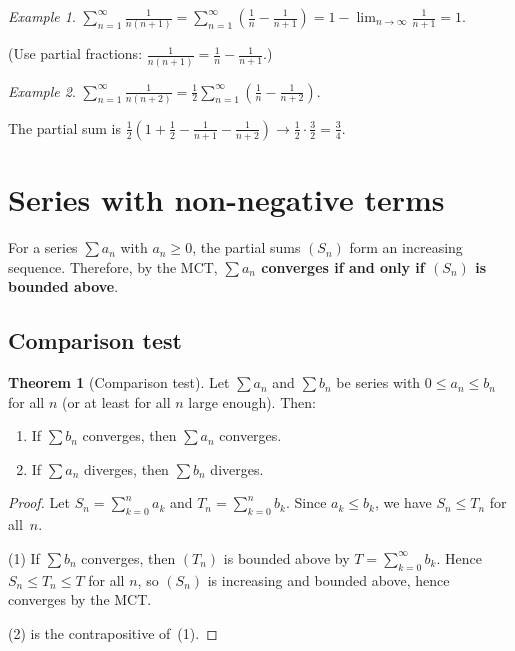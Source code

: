 \documentclass[12pt,a4paper,openany]{book}
\theoremstyle{definition}
\newtheorem{theorem}{Theorem}[chapter]
\theoremstyle{remark}
\newtheorem{example}{Example}[chapter]
\begin{document}
\begin{example}\label{ex:telescoping1}
$\displaystyle\sum_{n=1}^{\infty}\frac{1}{n(n+1)}
= \sum_{n=1}^{\infty}\left(\frac{1}{n} - \frac{1}{n+1}\right)
= 1 - \lim_{n\to\infty}\frac{1}{n+1} = 1$.

(Use partial fractions: $\frac{1}{n(n+1)} = \frac{1}{n} - \frac{1}{n+1}$.)
\end{example}

\begin{example}\label{ex:telescoping2}
$\displaystyle\sum_{n=1}^{\infty}\frac{1}{n(n+2)}
= \frac{1}{2}\sum_{n=1}^{\infty}\left(\frac{1}{n}-\frac{1}{n+2}\right)$.

The partial sum is
$\frac{1}{2}\!\left(1 + \frac{1}{2} - \frac{1}{n+1} - \frac{1}{n+2}\right)
\to \frac{1}{2}\cdot\frac{3}{2} = \frac{3}{4}$.
\end{example}

\section{Series with non-negative terms}\label{sec:positive-series}

For a series $\sum a_n$ with $a_n \geq 0$, the partial sums $(S_n)$ form an
increasing sequence. Therefore, by the MCT, \textbf{$\sum a_n$ converges
if and only if $(S_n)$ is bounded above}.

\subsection{Comparison test}\label{subsec:comparison}

\begin{theorem}[Comparison test]\label{thm:comparison}
Let $\sum a_n$ and $\sum b_n$ be series with $0 \leq a_n \leq b_n$ for all
$n$ (or at least for all $n$ large enough). Then:
\begin{enumerate}
\item If $\sum b_n$ converges, then $\sum a_n$ converges.
\item If $\sum a_n$ diverges, then $\sum b_n$ diverges.
\end{enumerate}
\end{theorem}

\begin{proof}
Let $S_n = \sum_{k=0}^{n}a_k$ and $T_n = \sum_{k=0}^{n}b_k$.
Since $a_k \leq b_k$, we have $S_n \leq T_n$ for all~$n$.

(1) If $\sum b_n$ converges, then $(T_n)$ is bounded above by
$T = \sum_{k=0}^{\infty}b_k$. Hence $S_n \leq T_n \leq T$ for all $n$,
so $(S_n)$ is increasing and bounded above, hence converges by the MCT.

(2) is the contrapositive of~(1).
\end{proof}
\end{document}
